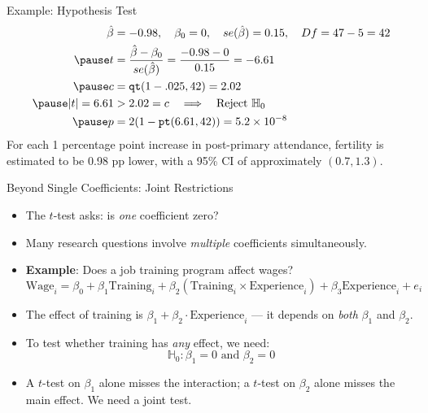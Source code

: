 \documentclass[aspectratio=169, handout, t]{beamer}
\numberwithin{equation}{section}
\begin{document}
\begin{frame}{Example: Hypothesis Test}
\begin{align*}
\hat{\beta}&=-0.98, \quad \beta_0=0, \quad se(\hat{\beta})=0.15, \quad Df=47-5=42\\\pause
t&=\frac{\hat{\beta}-\beta_0}{se(\hat{\beta})}=\frac{-0.98-0}{0.15}=-6.61\\\pause
 c&=\texttt{qt}(1-.025,42)=2.02\\\pause
  |t|=6.61&>2.02=c \quad\Longrightarrow\quad \text{Reject } \mathbb{H}_0\\\pause
  p&=2(1-\texttt{pt}(6.61, 42))=5.2\times 10^{-8}
  \end{align*}\pause
\medskip
For each 1 percentage point increase in post-primary attendance, fertility is estimated to be 0.98 pp lower, with a 95\% CI of approximately $(0.7, 1.3)$.
\end{frame}

\begin{frame}{Beyond Single Coefficients: Joint Restrictions}
\begin{itemize}
\item The $t$-test asks: is \emph{one} coefficient zero?\pause
\item Many research questions involve \emph{multiple} coefficients simultaneously.\pause
\item \textbf{Example}: Does a job training program affect wages?
$$\text{Wage}_i = \beta_0 + \beta_1 \text{Training}_i + \beta_2 (\text{Training}_i \times \text{Experience}_i) + \beta_3 \text{Experience}_i + e_i$$\pause
\item The effect of training is $\beta_1 + \beta_2 \cdot \text{Experience}_i$ --- it depends on \emph{both} $\beta_1$ and $\beta_2$.\pause
\item To test whether training has \emph{any} effect, we need:
$$\mathbb{H}_0: \beta_1 = 0 \text{ and } \beta_2 = 0$$\pause
\item A $t$-test on $\beta_1$ alone misses the interaction; a $t$-test on $\beta_2$ alone misses the main effect.  We need a \alert{joint test}.
\end{itemize}
\end{frame}
\end{document}
